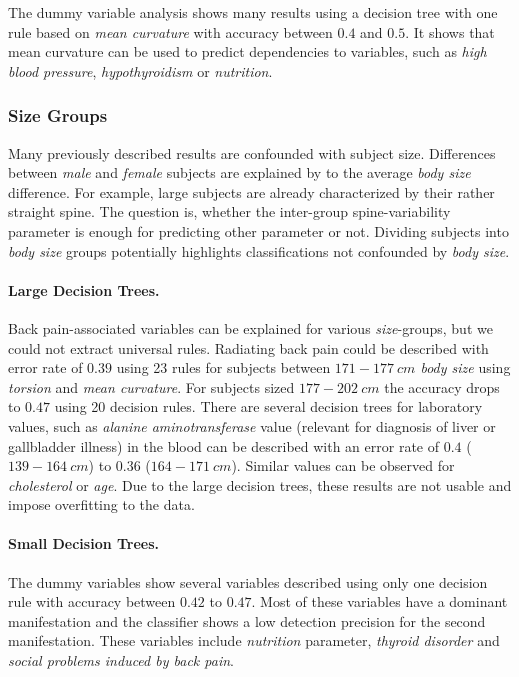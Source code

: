 \documentclass[a4paper,twoside]{style/article}
\begin{document}
The dummy variable analysis shows many results using a decision tree with one rule based on \emph{mean curvature} with accuracy between $0.4$ and $0.5$.
It shows that mean curvature can be used to predict dependencies to variables, such as \emph{high blood pressure}, \emph{hypothyroidism} or \emph{nutrition}.

\subsubsection{Size Groups}
Many previously described results are confounded with subject size.
Differences between \emph{male} and \emph{female} subjects are explained by to the average \emph{body size} difference.
For example, large subjects are already characterized by their rather straight spine.
%
The question is, whether the inter-group spine-variability parameter is enough for predicting other parameter or not.
Dividing subjects into \emph{body size} groups potentially highlights classifications not confounded by \emph{body size}.
\paragraph{Large Decision Trees. }
Back pain-associated variables can be explained for various \emph{size}-groups, but we could not extract universal rules.
Radiating back pain could be described with error rate of $0.39$ using 23 rules for subjects between \emph{$171-177~cm$ body size} using \emph{torsion} and \emph{mean curvature}.
For subjects sized \emph{$177-202~cm$} the accuracy drops to $0.47$ using 20 decision rules.
There are several decision trees for laboratory values, such as \emph{alanine aminotransferase} value (relevant for diagnosis of liver or gallbladder illness) in the blood can be described with an error rate of $0.4$ (\emph{$139-164~cm$}) to $0.36$ (\emph{$164 - 171~cm$}).
Similar values can be observed for \emph{cholesterol} or \emph{age}.
Due to the large decision trees, these results are not usable and impose overfitting to the data.
\paragraph{Small Decision Trees. }
The dummy variables show several variables described using only one decision rule with accuracy between $0.42$ to $0.47$.
Most of these variables have a dominant manifestation and the classifier shows a low detection precision for the second manifestation.
These variables include \emph{nutrition} parameter, \emph{thyroid disorder} and \emph{social problems induced by back pain}.
\end{document}
